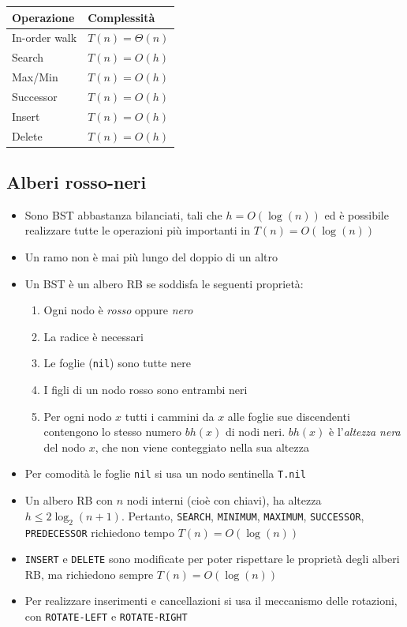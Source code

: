 \documentclass[10pt,a4paper]{article}
\newcommand{\code}{\texttt}
\begin{document}
\begin{multicols*}{2}
\begin{tabular}{l l}
    Operazione & Complessità\\
    \hline
    In-order walk & $T(n) = \varTheta(n)$ \\
    Search & $T(n) = O(h)$ \\
    Max/Min & $T(n) = O(h) $\\
    Successor & $T(n) = O(h) $\\
    Insert & $T(n) = O(h) $\\
    Delete & $T(n) = O(h) $\\
\end{tabular}
\subsection*{Alberi rosso-neri}
\begin{itemize}
    \item Sono BST abbastanza bilanciati, tali che $h = O(\log(n))$ ed è possibile realizzare tutte le operazioni più importanti in $T(n) = O(\log(n))$
    \item Un ramo non è mai più lungo del doppio di un altro
    \item Un BST è un albero RB se soddisfa le seguenti proprietà:
    \begin{enumerate}
        \item Ogni nodo è \emph{rosso} oppure \emph{nero}
        \item La radice è necessari
        \item Le foglie (\code{nil}) sono tutte nere
        \item I figli di un nodo rosso sono entrambi neri
        \item Per ogni nodo $x$ tutti i cammini da $x$ alle foglie sue discendenti contengono lo stesso numero $bh(x)$ di nodi neri. $bh(x)$ è l'\emph{altezza nera} del nodo $x$, che non viene conteggiato nella sua altezza
    \end{enumerate}
    \item Per comodità le foglie \code{nil} si usa un nodo sentinella \code{T.nil}
    \item Un albero RB con $n$ nodi interni (cioè con chiavi), ha altezza $h \le 2\log_2(n+1)$. Pertanto, \code{SEARCH}, \code{MINIMUM}, \code{MAXIMUM}, \code{SUCCESSOR}, \code{PREDECESSOR} richiedono tempo $T(n) = O(\log(n))$
    \item \code{INSERT} e \code{DELETE} sono modificate per poter rispettare le proprietà degli alberi RB, ma richiedono sempre $T(n) = O(\log(n))$
    \item Per realizzare inserimenti e cancellazioni si usa il meccanismo delle rotazioni, con \code{ROTATE-LEFT} e \code{ROTATE-RIGHT}
\end{itemize}


\end{multicols*}
\end{document}
